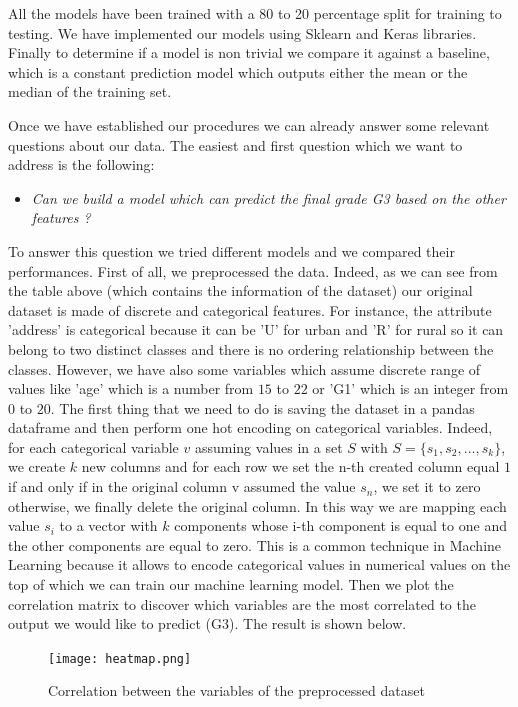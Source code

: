 \documentclass[a4paper, 11pt]{article}
\theoremstyle{definition}
\numberwithin{equation}{section}		%
\numberwithin{table}{section}				%
\begin{document}
All the models have been trained with a 80 to 20 percentage split for training to testing. We have implemented our models using Sklearn and Keras libraries. Finally to determine if a model is non trivial we compare it against a baseline, which is a constant prediction model which outputs either the mean or the median of the training set.
\bigskip

Once we have established our procedures we can already answer some relevant questions about our data. The easiest and first question which we want to address is the following:
\begin{itemize}
\item \textit{Can we build a model which can predict the final grade G3 based on the other features ?}
\end{itemize}
To answer this question we tried different models and we compared their performances. First of all, we preprocessed the data. Indeed, as we can see from the table above (which contains the information of the dataset) our original dataset is made of discrete and categorical features. For instance, the attribute 'address' is categorical because it can be 'U' for urban and 'R' for rural so it can belong to two distinct classes and there is no ordering relationship between the classes. However, we have also some variables which assume discrete range of values like 'age' which is a number from $15$ to $22$ or 'G1' which is an integer from $0$ to $20$. The first thing that we need to do is saving the dataset in a pandas dataframe and then perform one hot encoding on categorical variables. Indeed, for each categorical variable $v$ assuming values in a set $S$ with $S=\{s_1,s_2,\dots, s_k\}$, we create $k$ new columns and for each row we set the n-th created column equal $1$ if and only if in the original column v assumed the value $s_n$, we set it to zero otherwise, we finally delete the original column. In this way we are mapping each value $s_i$ to a vector with $k$ components whose i-th component is equal to one and the other components are equal to zero. This is a common technique in Machine Learning because it allows to encode categorical values in numerical values on the top of which we can train our machine learning model. Then we plot the correlation matrix to discover which variables are the most correlated to the output we would like to predict (G3). The result is shown below. 
\begin{figure}[h]
\centering
\texttt{[image: heatmap.png]}
\caption{Correlation between the variables of the preprocessed dataset}
\end{figure}
\end{document}
